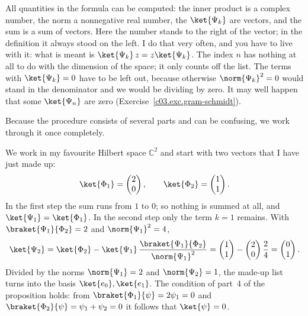 All quantities in the formula can be computed: the inner product is a complex number, the norm
a nonnegative real number, the $\ket{\Psi_k}$ are vectors, and the sum is a sum of vectors. Here the number stands to
the right of the vector; in the definition it always stood on the left. I do that very often,
and you have to live with it: what is meant is $\ket{\Psi_k}\, z = z \ket{\Psi_k}$. The index $n$
has nothing at all to do with the dimension of the space; it only counts off the list. The terms
with $\ket{\Psi_k} = 0$ have to be left out, because otherwise $\norm{\Psi_k}^2 = 0$ would stand
in the denominator and we would be dividing by zero. It may well happen that some $\ket{\Psi_n}$
are zero (Exercise~\ref{c03.exc.gram-schmidt}).

Because the procedure consists of several parts and can be confusing, we work through it once
completely.

\begin{example}\label{c03.ex.gram-schmidt}
  We work in my favourite Hilbert space $\mathbb{C}^2$ and start with two vectors that I have
  just made up:
  \begin{equation}\label{c03.eq.gs-start}
    \ket{\Phi_1} = \begin{pmatrix} 2 \\ 0 \end{pmatrix},
    \qquad
    \ket{\Phi_2} = \begin{pmatrix} 1 \\ 1 \end{pmatrix} .
  \end{equation}
  In the first step the sum runs from $1$ to $0$; so nothing is summed at all, and
  $\ket{\Psi_1} = \ket{\Phi_1}$. In the second step only the term $k = 1$ remains. With
  $\braket{\Psi_1}{\Phi_2} = 2$ and $\norm{\Psi_1}^2 = 4$,
  \begin{equation}\label{c03.eq.gs-beispiel}
    \ket{\Psi_2} = \ket{\Phi_2} - \ket{\Psi_1}\, \frac{\braket{\Psi_1}{\Phi_2}}{\norm{\Psi_1}^2}
    = \begin{pmatrix} 1 \\ 1 \end{pmatrix} - \begin{pmatrix} 2 \\ 0 \end{pmatrix} \frac{2}{4}
    = \begin{pmatrix} 0 \\ 1 \end{pmatrix} .
  \end{equation}
  Divided by the norms $\norm{\Psi_1} = 2$ and $\norm{\Psi_2} = 1$, the made-up list turns into
  the basis $\ket{e_0}, \ket{e_1}$. The condition of part~4 of the proposition holds: from
  $\braket{\Phi_1}{\psi} = 2\psi_1 = 0$ and $\braket{\Phi_2}{\psi} = \psi_1 + \psi_2 = 0$ it
  follows that $\ket{\psi} = 0$.
\end{example}

